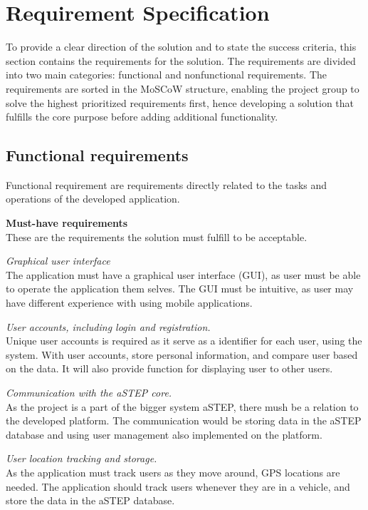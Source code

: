 \section{Requirement Specification}
To provide a clear direction of the solution and to state the success criteria, this section contains the requirements for the solution. 
The requirements are divided into two main categories: functional and nonfunctional requirements. 
The requirements are sorted in the MoSCoW structure, enabling the project group to solve the highest prioritized requirements first, hence developing a solution that fulfills the core purpose before adding additional functionality.


\subsection{Functional requirements}
Functional requirement are requirements directly related to the tasks and operations of the developed application.

\textbf{Must-have requirements}\\
These are the requirements the solution must fulfill to be acceptable.

\textit{Graphical user interface}\\
The application must have a graphical user interface (GUI), as user must be able to operate the application them selves. 
The GUI must be intuitive, as user may have different experience with using mobile applications.

\textit{User accounts, including login and registration.}\\
Unique user accounts is required as it serve as a identifier for each user, using the system. With user accounts, store personal information, and compare user based on the data. 
It will also provide function for displaying user to other users.

\textit{Communication with the aSTEP core.}\\
As the project is a part of the bigger system aSTEP, there mush be a relation to the developed platform. 
The communication would be storing data in the aSTEP database and using user management also implemented on the platform.

\textit{User location tracking and storage.}\\
As the application must track users as they move around, GPS locations are needed. 
The application should track users whenever they are in a vehicle, and store the data in the aSTEP database. 

